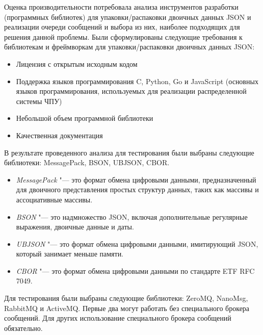 Оценка производительности потребовала анализа инструментов разработки (программных библиотек) для упаковки/распаковки двоичных данных JSON и реализации очереди сообщений и выбора из них, наиболее подходящих для решения данной проблемы. Были сформулированы следующие требования к библиотекам и фреймворкам для упаковки/распаковки двоичных данных JSON:

\begin{itemize}
	\item Лицензия с открытым исходным кодом
	\item Поддержка языков программирования C, Python, Go и JavaScript (основных языков программирования, используемых для реализации распределенной системы ЧПУ)
	\item Небольшой объем программной библиотеки
	\item Качественная документация
\end{itemize}


В результате проведенного анализа для тестирования были выбраны следующие библиотеки: MessagePack, BSON, UBJSON, CBOR.

\begin{itemize}
	\item \textit{MessagePack} "--- это формат обмена цифровыми данными, предназначенный для двоичного представления простых структур данных, таких как массивы и ассоциативные массивы.
	\item \textit{BSON} "--- это надмножество JSON, включая дополнительные регулярные выражения, двоичные данные и даты.
	\item \textit{UBJSON} "--- это формат обмена цифровыми данными, имитирующий JSON, который занимает меньше памяти.
	\item \textit{CBOR} "--- это формат обмена цифровыми данными по стандарте ETF RFC 7049.
\end{itemize}


Для тестирования были выбраны следующие библиотеки: ZeroMQ, NanoMsg, RabbitMQ и ActiveMQ. Первые два могут работать без специального брокера сообщений. Для других использование специального брокера сообщений обязательно.


